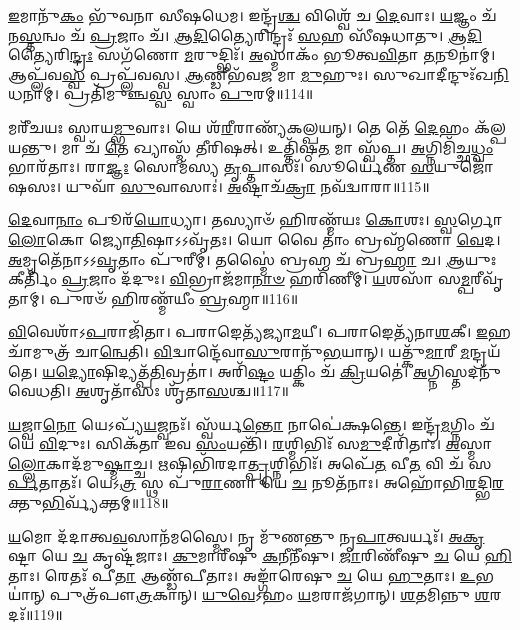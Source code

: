 \-\ul{𑌇}\-𑌮𑌾𑌨𑍁᳴\-\ul{𑌕𑌂} 𑌭𑍁᳴𑌵𑌨𑌾 𑌸𑍀𑌷𑌧𑍇𑌮। 𑌇𑌨𑍍𑌦𑍍𑌰᳴\-\ul{𑌶𑍍𑌚} 𑌵𑌿𑌶𑍍𑌵𑍇᳴ 𑌚 \ul{𑌦𑍇}\-𑌵𑌾𑌃। 
\-\ul{𑌯}\-𑌜𑍍𑌞𑌂 𑌚᳴ 𑌨\-\ul{𑌸𑍍𑌤}\-𑌨𑍍𑌵𑌂 𑌚᳴ \ul{𑌪𑍍𑌰}\-𑌜𑌾𑌂 𑌚᳴। \ul{𑌆}\-\-\ul{𑌦𑌿}\-𑌤𑍍𑌯𑍈𑌰𑌿𑌨𑍍𑌦𑍍𑌰𑌃᳴ \ul{𑌸}\-𑌹 𑌸𑍀᳴𑌷𑌧𑌾𑌤𑍁। 
\-\ul{𑌆}\-\-\ul{𑌦𑌿}\-𑌤𑍍𑌯𑍈𑌰𑌿\-\ul{𑌨𑍍𑌦𑍍𑌰𑌃} 𑌸𑌗᳴𑌣𑍋 \ul{𑌮}\-𑌰𑍁𑌦𑍍𑌭𑌿𑌃᳴। \ul{𑌅}\-𑌸𑍍𑌮𑌾𑌕𑌂᳴ 𑌭𑍂𑌤𑍍𑌵\-\ul{𑌵𑌿}\-𑌤𑌾 \ul{𑌤}\-𑌨𑍂𑌨𑌾॑𑌮𑍍। 
𑌆𑌪𑍍𑌲᳴𑌵\-\ul{𑌸𑍍𑌵} 𑌪𑍍𑌰𑌪𑍍𑌲᳴𑌵𑌸𑍍𑌵। \ul{𑌆}\-𑌣𑍍𑌡𑍀𑌭᳴𑌵\-\ul{𑌜} 𑌮𑌾 \ul{𑌮𑍁}\-𑌹𑍁𑌃। 
𑌸𑍁𑌖𑌾𑌦𑍀𑌨𑍍𑌦𑍁𑌃᳴𑌖\-\ul{𑌨𑌿}\-𑌧𑌨𑌾𑌮𑍍। 𑌪𑍍𑌰𑌤𑌿᳴𑌮𑍁𑌞𑍍𑌚\-\ul{𑌸𑍍𑌵} 𑌸𑍍𑌵𑌾𑌂 \ul{𑌪𑍁}\-𑌰𑌮𑍍॥114॥


𑌮𑌰𑍀᳴𑌚𑌯𑌃 𑌸𑍍𑌵𑌾𑌯\-\ul{𑌮𑍍𑌭𑍁}\-𑌵𑌾𑌃। 𑌯𑍇 𑌶᳴\-\ul{𑌰𑍀}\-𑌰𑌾𑌣𑍍𑌯᳴𑌕𑌲𑍍𑌪𑌯𑌨𑍍। 
𑌤𑍇 𑌤𑍇᳴ \ul{𑌦𑍇}\-𑌹𑌂 𑌕᳴𑌲𑍍𑌪𑌯𑌨𑍍𑌤𑍁। 𑌮𑌾 𑌚᳴ \ul{𑌤𑍇} 𑌖𑍍𑌯𑌾𑌸𑍍𑌮᳴ 𑌤𑍀𑌰𑌿𑌷𑌤𑍍। 
𑌉𑌤𑍍𑌤𑌿᳴𑌷𑍍𑌠\-\ul{𑌤} 𑌮𑌾 𑌸𑍍𑌵᳴𑌪𑍍𑌤। \ul{𑌅}\-𑌗𑍍𑌨𑌿𑌮𑌿᳴𑌚𑍍𑌛\-\ul{𑌧𑍍𑌵𑌂} 𑌭𑌾𑌰᳴𑌤𑌾𑌃। 
𑌰𑌾\-\ul{𑌜𑍍𑌞𑌃} 𑌸𑍋𑌮᳴𑌸𑍍𑌯 \ul{𑌤𑍃}\-𑌪𑍍𑌤𑌾𑌸𑌃᳴। 𑌸𑍂𑌰𑍍𑌯𑍇᳴𑌣 \ul{𑌸}\-𑌯𑍁𑌜𑍋᳴𑌷𑌸𑌃। 
𑌯𑍁𑌵𑌾᳴ \ul{𑌸𑍁}\-𑌵𑌾𑌸𑌾𑌃॑। \ul{𑌅}\-𑌷𑍍𑌟𑌾𑌚᳴\-\ul{𑌕𑍍𑌰𑌾} 𑌨𑌵᳴𑌦𑍍𑌵𑌾𑌰𑌾॥115॥


\-\ul{𑌦𑍇}\-𑌵𑌾\-\ul{𑌨𑌾𑌂} 𑌪𑍂𑌰᳴\-\ul{𑌯𑍋}\-𑌧𑍍𑌯𑌾। 𑌤𑌸𑍍𑌯𑌾𑍞᳴ 𑌹𑌿𑌰𑌣𑍍𑌮᳴𑌯𑌃 \ul{𑌕𑍋}\-𑌶𑌃। 
\-\ul{𑌸𑍍𑌵}\-𑌰𑍍𑌗𑍋 \ul{𑌲𑍋}\-𑌕𑍋 𑌜𑍍𑌯𑍋\-\ul{𑌤𑌿}\-𑌷𑌾𑌽𑌽𑌵𑍃᳴𑌤𑌃। 𑌯𑍋 𑌵𑍈 𑌤𑌾𑌂॑ 𑌬𑍍𑌰𑌹𑍍𑌮᳴𑌣𑍋 \ul{𑌵𑍇}\-𑌦। 
\-\ul{𑌅}\-𑌮𑍃𑌤𑍇᳴𑌨𑌾𑌽𑌽\-\ul{𑌵𑍃}\-𑌤𑌾𑌂 𑌪𑍁᳴𑌰𑍀𑌮𑍍। 𑌤𑌸𑍍𑌮𑍈॑ 𑌬𑍍𑌰𑌹𑍍𑌮 𑌚᳴ 𑌬𑍍𑌰\-\ul{𑌹𑍍𑌮𑌾} 𑌚। 
\-\ul{𑌆}\-𑌯𑍁𑌃 𑌕𑍀𑌰𑍍𑌤𑌿𑌂᳴ \ul{𑌪𑍍𑌰}\-𑌜𑌾𑌂 𑌦᳴𑌦𑍁𑌃। \ul{𑌵𑌿}\-𑌭𑍍𑌰𑌾𑌜᳴𑌮𑌾\-\ul{𑌨𑌾}\-\-\ul{𑍞} 𑌹𑌰𑌿᳴𑌣𑍀𑌮𑍍। 
\-\ul{𑌯}\-𑌶𑌸𑌾᳴ 𑌸\-\ul{𑌮𑍍𑌪}\-𑌰𑍀𑌵𑍃᳴𑌤𑌾𑌮𑍍। 𑌪𑍁𑌰𑍞᳴ 𑌹𑌿𑌰𑌣𑍍𑌮᳴𑌯𑍀𑌂 \ul{𑌬𑍍𑌰}\-𑌹𑍍𑌮𑌾॥116॥


\-\ul{𑌵𑌿}\-𑌵𑍇𑌶𑌾᳴𑌽\-\ul{𑌪}\-𑌰𑌾𑌜𑌿᳴𑌤𑌾। 𑌪𑌰𑌾𑌙𑍇𑌤𑍍𑌯᳴𑌜𑍍𑌯𑌾\-\ul{𑌮}\-𑌯𑍀। 
𑌪𑌰𑌾𑌙𑍇𑌤𑍍𑌯᳴𑌨𑌾\-\ul{𑌶}\-𑌕𑍀। \ul{𑌇}\-𑌹 𑌚𑌾᳴𑌮𑍁𑌤𑍍𑌰᳴ 𑌚𑌾\-\ul{𑌨𑍍𑌵𑍇}\-𑌤𑌿। 
\-\ul{𑌵𑌿}\-𑌦𑍍𑌵𑌾𑌨𑍍𑌦𑍇᳴𑌵𑌾\-\ul{𑌸𑍁}\-𑌰𑌾𑌨𑍁᳴\-\ul{𑌭}\-𑌯𑌾𑌨𑍍। 𑌯𑌤𑍍𑌕𑍁᳴\-\ul{𑌮𑌾}\-𑌰𑍀 \ul{𑌮}\-𑌨𑍍𑌦𑍍𑌰𑌯᳴𑌤𑍇। 
\-\ul{𑌯}\-\-\ul{𑌦𑍍𑌯𑍋}\-𑌷𑌿𑌦𑍍𑌯𑌤𑍍𑌪᳴\-\ul{𑌤𑌿}\-𑌵𑍍𑌰𑌤𑌾॑। 𑌅𑌰𑌿᳴\-\ul{𑌷𑍍𑌟𑌂} 𑌯𑌤𑍍𑌕𑌿𑌂 𑌚᳴ \ul{𑌕𑍍𑌰𑌿}\-𑌯𑌤𑍇॑। 
\-\ul{𑌅}\-𑌗𑍍𑌨𑌿𑌸𑍍𑌤𑌦𑌨𑍁᳴𑌵𑍇𑌧𑌤𑌿। \ul{𑌅}\-𑌶𑍃𑌤𑌾᳴𑌸𑌃 𑌶𑍃᳴𑌤𑌾\-\ul{𑌸}\-𑌶𑍍𑌚॥117॥


\-\ul{𑌯}\-𑌜𑍍𑌵𑌾\-\ul{𑌨𑍋} 𑌯𑍇𑌽𑌪𑍍𑌯᳴\-\ul{𑌯}\-𑌜𑍍𑌵𑌨𑌃᳴। 𑌸𑍍𑌵᳴𑌰𑍍𑌯\-\ul{𑌨𑍍𑌤𑍋} 𑌨𑌾𑌪𑍇॑𑌕𑍍𑌷𑌨𑍍𑌤𑍇। 
𑌇𑌨𑍍𑌦𑍍𑌰᳴\-\ul{𑌮}\-𑌗𑍍𑌨𑌿𑌂 𑌚᳴ 𑌯𑍇 \ul{𑌵𑌿}\-𑌦𑍁𑌃। 𑌸𑌿𑌕᳴𑌤𑌾 𑌇𑌵 \ul{𑌸𑌂}\-𑌯𑌨𑍍𑌤𑌿᳴। 
\-\ul{𑌰}\-𑌶𑍍𑌮𑌿𑌭𑌿𑌃᳴ 𑌸\-\ul{𑌮𑍁}\-𑌦𑍀𑌰𑌿᳴𑌤𑌾𑌃। \ul{𑌅}\-𑌸𑍍𑌮𑌾\-\-\ul{𑌲𑍍𑌲𑍋}\-𑌕𑌾\-𑌦᳴𑌮𑍁\-\ul{𑌷𑍍𑌮𑌾}\-𑌚𑍍𑌚। 
\-\ul{𑌋}\-𑌷𑌿𑌭𑌿᳴𑌰𑌦𑌾\-\ul{𑌤𑍍𑌪𑍃}\-𑌶𑍍𑌨𑌿𑌭𑌿𑌃᳴। 
𑌅𑌪𑍇᳴\-\ul{𑌤} 𑌵𑍀\-\ul{𑌤} 𑌵𑌿 𑌚᳴ 𑌸\-\ul{𑌰𑍍𑌪}\-𑌤𑌾𑌤𑌃᳴। 𑌯𑍇𑌽\-\ul{𑌤𑍍𑌰} 𑌸𑍍𑌥 𑌪𑍁᳴\-\ul{𑌰𑌾}\-𑌣𑌾 𑌯𑍇 \ul{𑌚} 𑌨𑍂𑌤᳴𑌨𑌾𑌃। 
𑌅𑌹𑍋᳴𑌭𑌿\-\ul{𑌰}\-𑌦𑍍𑌭𑌿\-\ul{𑌰}\-𑌕𑍍𑌤𑍁\-\-\ul{𑌭𑌿}\-𑌰𑍍𑌵𑍍𑌯᳴𑌕𑍍𑌤𑌮𑍍॥118॥


\-\ul{𑌯}\-𑌮𑍋 𑌦᳴𑌦𑌾𑌤𑍍𑌵\-\ul{𑌵}\-𑌸𑌾𑌨᳴𑌮𑌸𑍍𑌮𑍈। 𑌨𑍃 𑌮𑍁᳴𑌣𑌨𑍍𑌤𑍁 𑌨𑍃\-\ul{𑌪𑌾}\-𑌤𑍍𑌵𑌰𑍍𑌯𑌃᳴। 
\-\ul{𑌅}\-\-\ul{𑌕𑍃}\-𑌷𑍍𑌟𑌾 𑌯𑍇 \ul{𑌚} 𑌕𑍃𑌷𑍍𑌟᳴𑌜𑌾𑌃। \ul{𑌕𑍁}\-𑌮𑌾𑌰𑍀᳴𑌷𑍁 \ul{𑌕}\-𑌨𑍀𑌨𑍀᳴𑌷𑍁। 
\-\ul{𑌜𑌾}\-𑌰𑌿𑌣𑍀᳴𑌷𑍁 \ul{𑌚} 𑌯𑍇 \ul{𑌹𑌿}\-𑌤𑌾𑌃। 𑌰𑍇𑌤𑌃᳴ 𑌪𑍀\-\ul{𑌤𑌾} 𑌆𑌣𑍍𑌡᳴𑌪𑍀𑌤𑌾𑌃। 
𑌅𑌙𑍍𑌗𑌾᳴𑌰𑍇𑌷𑍁 \ul{𑌚} 𑌯𑍇 \ul{𑌹𑍁}\-𑌤𑌾𑌃। \ul{𑌉}\-𑌭𑌯𑌾॑𑌨𑍍‌ 𑌪𑍁𑌤𑍍𑌰᳴𑌪𑍗\-\ul{𑌤𑍍𑌰}\-𑌕𑌾𑌨𑍍। 
\-\ul{𑌯𑍁}\-\-\ul{𑌵𑍇}\-𑌽𑌹𑌂 \ul{𑌯}\-𑌮𑌰𑌾𑌜᳴𑌗𑌾𑌨𑍍। \ul{𑌶}\-𑌤𑌮𑌿𑌨𑍍𑌨𑍁 \ul{𑌶}\-𑌰𑌦𑌃᳴॥119॥


